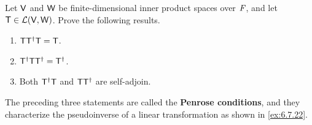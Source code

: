 \begin{ex}\label{ex:6.7.21}
  Let \(\mathsf{V}\) and \(\mathsf{W}\) be finite-dimensional inner product spaces over \(\mathit{F}\), and let \(\mathsf{T} \in \mathcal{L}(\mathsf{V}, \mathsf{W})\).
  Prove the following results.
  \begin{enumerate}
    \item \(\mathsf{T} \mathsf{T}^{\dag} \mathsf{T} = \mathsf{T}\).
    \item \(\mathsf{T}^{\dag} \mathsf{T} \mathsf{T}^{\dag} = \mathsf{T}^{\dag}\).
    \item Both \(\mathsf{T}^{\dag} \mathsf{T}\) and \(\mathsf{T} \mathsf{T}^{\dag}\) are self-adjoin.
  \end{enumerate}
  The preceding three statements are called the \textbf{Penrose conditions}, and they characterize the pseudoinverse of a linear transformation as shown in \cref{ex:6.7.22}.
\end{ex}

